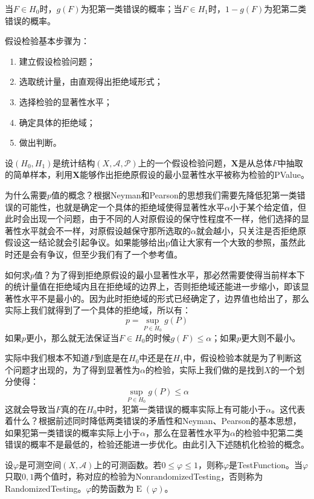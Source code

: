 \begin{note}
	当$F\in H_0$时，$g(F)$为犯第一类错误的概率；当$F\in H_1$时，$1-g(F)$为犯第二类错误的概率。
\end{note}
\begin{method}
	假设检验基本步骤为：
	\begin{enumerate}
		\item 建立假设检验问题；
		\item 选取统计量，由直观得出拒绝域形式；
		\item 选择检验的显著性水平；
		\item 确定具体的拒绝域；
		\item 做出判断。
	\end{enumerate}
\end{method}
\begin{definition}
	设$(H_0,H_1)$是统计结构$(X,\mathscr{A},\mathscr{P})$上的一个假设检验问题，$\mathbf{X}$是从总体$F$中抽取的简单样本，利用$\mathbf{X}$能够作出拒绝原假设的最小显著性水平被称为检验的\gls{PValue}。
\end{definition}
\begin{note}
	为什么需要$p$值的概念？根据Neyman和Pearson的思想我们需要先降低犯第一类错误的可能性，也就是确定一个具体的拒绝域使得显著性水平$\alpha$小于某个给定值，但此时会出现一个问题，由于不同的人对原假设的保守性程度不一样，他们选择的显著性水平就会不一样，对原假设越保守那所选取的$\alpha$就会越小，只关注是否拒绝原假设这一结论就会引起争议。如果能够给出p值让大家有一个大致的参照，虽然此时还是会有争议，但至少我们有了一个参考值。\par
	如何求$p$值？为了得到拒绝原假设的最小显著性水平，那必然需要使得当前样本下的统计量值在拒绝域内且在拒绝域的边界上，否则拒绝域还能进一步缩小，即该显著性水平不是最小的。因为此时拒绝域的形式已经确定了，边界值也给出了，那么实际上我们就得到了一个具体的拒绝域，所以有：
	\begin{equation*}
		p=\sup_{P\in H_0}g(P)
	\end{equation*}
	如果$p$更小，那么就无法保证当$F\in H_0$的时候$g(F)\leqslant\alpha$；如果$p$更大则不最小。
\end{note}
\begin{note}
	实际中我们根本不知道$F$到底是在$H_0$中还是在$H_1$中，假设检验本就是为了判断这个问题才出现的，为了得到显著性为$\alpha$的检验，实际上我们做的是找到$X$的一个划分使得：
	\begin{equation*}
		\sup_{P\in H_0}g(P)\leqslant\alpha
	\end{equation*}
	这就会导致当$F$真的在$H_0$中时，犯第一类错误的概率实际上有可能小于$\alpha$。这代表着什么？根据前述同时降低两类错误的矛盾性和Neyman、Pearson的基本思想，如果犯第一类错误的概率实际上小于$\alpha$，那么在显著性水平为$\alpha$的检验中犯第二类错误的概率不是最低的，检验还能进一步优化。由此引入下述随机化检验的概念。
\end{note}
\begin{definition}
	设$\varphi$是可测空间$(X,\mathscr{A})$上的可测函数。若$0\leqslant\varphi\leqslant1$，则称$\varphi$是\gls{TestFunction}。当$\varphi$只取$0,1$两个值时，称对应的检验为\gls{NonrandomizedTesting}，否则称为\gls{RandomizedTesting}。$\varphi$的势函数为$\operatorname{E}(\varphi)$。
\end{definition}

